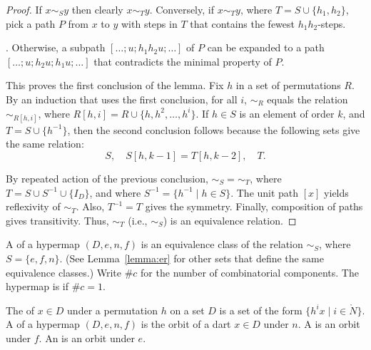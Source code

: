 \begin{proof} If $x\sim_S y$ then clearly $x\sim_T y$.  Conversely,
if $x\sim_T y$, where $T = S\cup\{h_1,h_2\}$, pick a path $P$ from $x$ to $y$ with steps
in $T$ that contains the fewest $h_1h_2$-steps.  

.  Otherwise, a subpath $[\ldots;u;h_1h_2u;\ldots]$
of $P$ can be expanded to a path $[\ldots;u;h_2u;h_1u;\ldots]$ that contradicts the minimal
property of $P$.

This proves the first conclusion of the lemma.  Fix $h$ in a set of permutations $R$.
By an induction that uses the first conclusion,  for all $i$, $\sim_R$ equals the relation $\sim_{R[h,i]}$,
where $R[h,i] = R \cup \{h,h^2,\ldots,h^i\}$.  If $h\in S$ is an element of order $k$, 
and $T = S\cup\{h^{-1}\}$, then
the second conclusion follows because the following sets give the same relation:
\begin{displaymath}
S,\quad S[h,k-1] = T[h,k-2],\quad T.
\end{displaymath}

By repeated action of the previous conclusion, $\sim_S=\sim_T$, where 
$T = S\cup S^{-1}\cup \{I_D\}$, and where $S^{-1} = \{h^{-1}\mid h\in S\}$.
The unit path $[x]$ yields reflexivity of $\sim_T$.  Also, $T^{-1} = T$ gives the symmetry.  Finally, composition of paths gives transitivity.  Thus, $\sim_T$ (i.e., $\sim_S$) is an equivalence relation.
\end{proof}

\begin{definition}
A  of a hypermap $(D,e,n,f)$ is an 
equivalence class of the relation $\sim_S$, where
$S=\{e,f,n\}$. 
(See Lemma~\ref{lemma:er} for other sets that define the same equivalence classes.)  
Write $\#c$ for the
number of combinatorial components.  The hypermap is  if
$\#c=1$.  %
%
%
%
%
\end{definition}





\begin{definition} The  of $x\in D$ under a permutation $h$ on
a set $D$ is a set of the form $\{h^i x\mid i\in\ring{N}\}$.  A 
of a hypermap $(D,e,n,f)$ is the orbit of a dart $x\in D$ under $n$.  
A  is an orbit under $f$.  
An  is an
orbit under $e$.  %
%
%
\end{definition}

